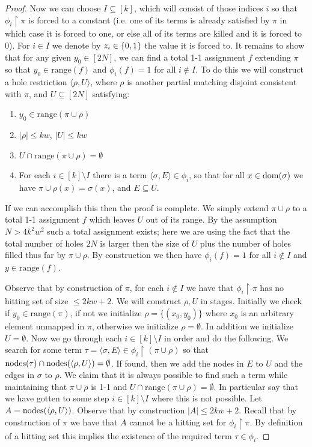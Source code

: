 \begin{proof}
Now we can choose $I \subseteq [k]$, which will consist of those indices $i$ so that $\phi_i\upharpoonright\pi$ is forced to a constant (i.e. one of its terms is already satisfied by $\pi$ in which case it is forced to one, or else all of its terms are killed and it is forced to 0). For $i \in I$ we denote by $z_i \in \{0,1\}$ the value it is forced to. It remains to show that for any given $y_0 \in [2N]$, we can find a total 1-1 assignment $f$ extending $\pi$ so that $y_0 \in \mathrm{range}(f)$ and $\phi_i(f)=1$ for all $i \notin I$. To do this we will construct a hole restriction $\langle \rho, U\rangle $, where $\rho$ is another partial matching disjoint consistent with $\pi$, and $U \subseteq [2N]$ satisfying:
\begin{enumerate}
    \item $y_0 \in \mathrm{range}(\pi \cup \rho)$
    \item $|\rho| \leq kw$, $|U| \leq kw$
    \item $U \cap \mathrm{range}(\pi \cup \rho) = \emptyset$
    \item For each $i \in [k] \setminus I$ there is a term $\langle \sigma, E\rangle \in \phi_i$, so that for all $x \in \mathrm{dom}(\sigma)$ we have $\pi \cup \rho(x) = \sigma(x)$, and $E \subseteq U$.
\end{enumerate}

If we can accomplish this then the proof is complete. We simply extend $\pi \cup \rho$ to a total 1-1 assignment $f$ which leaves $U$ out of its range. By the assumption $N > 4k^2w^2$ such a total assignment exists; here we are using the fact that the total number of holes $2N$ is larger then the size of $U$ plus the number of holes filled thus far by $\pi \cup \rho$. By construction we then have $\phi_i(f)=1$ for all $i \notin I$ and $y \in \mathrm{range}(f)$.

Observe that by construction of $\pi$, for each $i \notin I$ we have that $\phi_i\upharpoonright\pi$ has no hitting set of size $\leq 2kw+2$. We will construct $\rho, U$ in stages. Initially we check if $y_0 \in \mathrm{range}(\pi)$, if not we initialize $\rho = \{(x_0,y_0)\}$ where $x_0$ is an arbitrary element unmapped in $\pi$, otherwise we initialize $\rho = \emptyset$. 
In addition we initialize $U = \emptyset$. Now we go through each $i \in [k] \setminus I$ in order and do the following. We search for some term $\tau = \langle \sigma, E\rangle \in \phi_i \upharpoonright (\pi \cup \rho)$ so that $\mathrm{nodes}(\tau) \cap \mathrm{nodes}(\langle \rho, U\rangle) = \emptyset$. If found, then we add the nodes in $E$ to $U$ and the edges in $\sigma$ to $\rho$. We claim that it is always possible to find such a term while maintaining that $\pi \cup \rho$ is 1-1 and $U \cap \mathrm{range}(\pi \cup \rho) = \emptyset$. In particular say that we have gotten to some step $i \in [k] \setminus I$ where this is not possible. Let $A = \mathrm{nodes}(\langle \rho, U\rangle)$. Observe that by construction $|A|\leq 2kw+2$. Recall that by construction of $\pi$ we have that $A$ cannot be a hitting set for $\phi_i\upharpoonright\pi$. By definition of a hitting set this implies the existence of the required term $\tau \in \phi_i$.
\end{proof}

